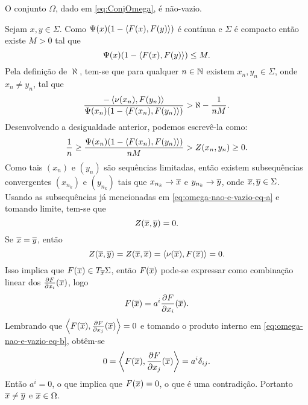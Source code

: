 \begin{lema}
O conjunto $\Omega$, dado em \eqref{eq:ConjOmega}, \'e n\~ao-vazio.
\end{lema}

\begin{demonstracao}
	Sejam $x,y \in \Sigma$. Como
	$\Psi(x) (1 - \left\langle F(x),F(y) \right\rangle)$ é contínua e
	$\Sigma$ é compacto então existe $M > 0$ tal que
	\begin{equation*}
	\Psi(x) (1 - \left\langle F(x),F(y) \right\rangle) \leq M.
	\end{equation*}
	Pela definição de $\aleph$, tem-se
	que para qualquer $n \in \mathbb{N}$ existem $x_n,y_n \in \Sigma$, onde $x_n \neq y_n$, tal que
	\begin{equation*}
	\frac{- \left\langle \nu(x_n),F(y_n) \right\rangle}{\Psi(x_n) (1 - \left\langle F(x_n),F(y_n) \right\rangle)} > \aleph - \frac{1}{nM}.
	\end{equation*}
	Desenvolvendo a desigualdade anterior, podemos escrevê-la como:
	\begin{equation}\label{eq:omega-nao-e-vazio-eq-a}
	\frac{1}{n} \geq \frac{\Psi(x_n) (1 - \left\langle F(x_n),F(y_n) \right\rangle)}{nM} > Z(x_n,y_n) \geq 0.
	\end{equation}
	Como tais $(x_n)$ e $(y_n)$ são sequências limitadas, então existem subsequências convergentes $(x_{n_k})$ e $(y_{n_k})$ tais que
	$x_{n_k} \rightarrow \overline{x}$ e
	$y_{n_k} \rightarrow \overline{y}$,
	onde $\overline{x}, \overline{y} \in \Sigma$.
	Usando as subsequências já mencionadas em \eqref{eq:omega-nao-e-vazio-eq-a} e tomando limite, tem-se que
	\begin{equation*}
	Z(\overline{x},\overline{y}) = 0.
	\end{equation*}
	Se $\overline{x} = \overline{y}$, então
	\begin{equation*}
	Z(\overline{x},\overline{y}) = Z(\overline{x}, \overline{x}) = \left\langle \nu(\overline{x}),F(\overline{x}) \right\rangle = 0.
	\end{equation*}
	Isso implica que 
	$F(\overline{x}) \in T_{\overline{x}} \Sigma$,
	então $F(\overline{x})$ pode-se expressar como combinação linear dos $\frac{\partial F}{\partial x_i}(\overline{x})$, logo
	\begin{equation}\label{eq:omega-nao-e-vazio-eq-b}
	F(\overline{x}) = a^i \frac{\partial F}{\partial x_i}(\overline{x}).
	\end{equation}
	Lembrando que
	$\left\langle F(\overline{x}),\frac{\partial F}{\partial x_j}(\overline{x}) \right\rangle = 0$
	e tomando o produto interno em \eqref{eq:omega-nao-e-vazio-eq-b}, obtêm-se
	\begin{equation*}
	0 = \left\langle F(\overline{x}),\frac{\partial F}{\partial x_j}(\overline{x}) \right\rangle = a^i \delta_{ij}.
	\end{equation*}
	Então
	$a^i = 0$,
	o que implica que
	$F(\overline{x}) = 0$, o que é uma contradição.
	Portanto
	$\overline{x} \neq \overline{y}$ e
	$\overline{x} \in \Omega$.
\end{demonstracao}

